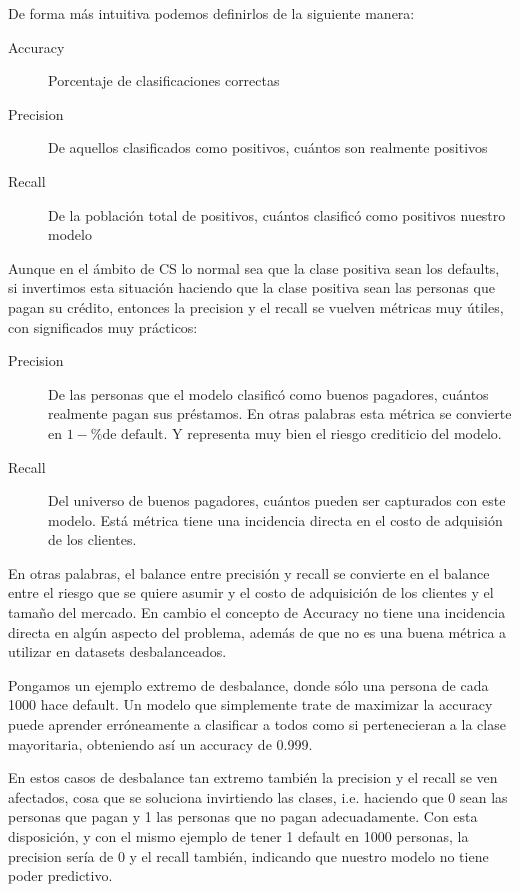 De forma más intuitiva podemos definirlos de la siguiente manera:

\begin{description}
    \item [Accuracy] Porcentaje de clasificaciones correctas
    \item [Precision] De aquellos clasificados como positivos, cuántos son realmente positivos
    \item [Recall] De la población total de positivos, cuántos clasificó como positivos nuestro modelo
\end{description}

Aunque en el ámbito de \ac{CS} lo normal sea que la clase positiva sean los defaults, si invertimos esta situación haciendo que la clase positiva sean las personas que pagan su crédito, entonces la precision y el recall se vuelven métricas muy útiles, con significados muy prácticos:

\begin{description}
    \item [Precision] De las personas que el modelo clasificó como buenos pagadores, cuántos realmente pagan sus préstamos. En otras palabras esta métrica se convierte en $1 - \text{\% de default}$. Y representa muy bien el riesgo crediticio del modelo.
    \item [Recall] Del universo de buenos pagadores, cuántos pueden ser capturados con este modelo. Está métrica tiene una incidencia directa en el costo de adquisión de los clientes.
\end{description}

En otras palabras, el balance entre precisión y recall se convierte en el balance entre el riesgo que se quiere asumir y el costo de adquisición de los clientes y el tamaño del mercado. En cambio el concepto de Accuracy no tiene una incidencia directa en algún aspecto del problema, además de que no es una buena métrica a utilizar en datasets desbalanceados.

Pongamos un ejemplo extremo de desbalance, donde sólo una persona de cada 1000 hace default. Un modelo que simplemente trate de maximizar la accuracy puede aprender erróneamente a clasificar a todos como si pertenecieran a la clase mayoritaria, obteniendo así un accuracy de 0.999.

En estos casos de desbalance tan extremo también la precision y el recall se ven afectados, cosa que se soluciona invirtiendo las clases, i.e. haciendo que 0 sean las personas que pagan y 1 las personas que no pagan adecuadamente. Con esta disposición, y con el mismo ejemplo de tener 1 default en 1000 personas, la precision sería de 0 y el recall también, indicando que nuestro modelo no tiene poder predictivo.

